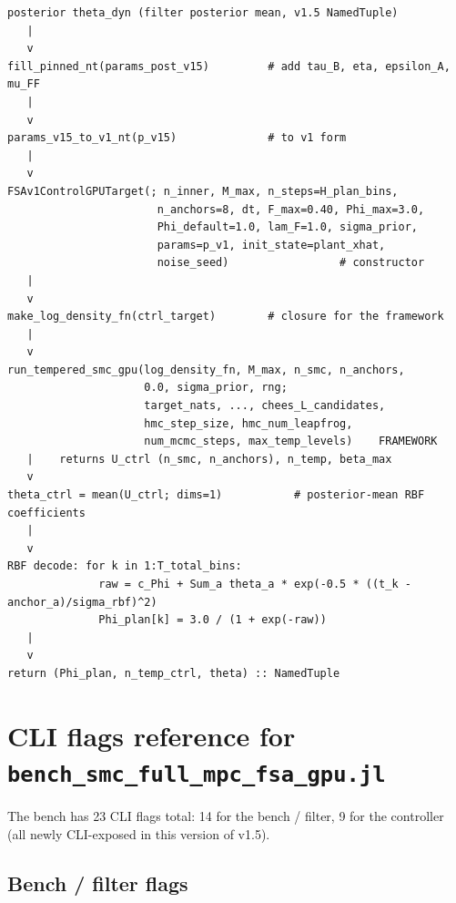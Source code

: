 \documentclass[11pt,a4paper]{article}
\begin{document}
\begin{verbatim}
posterior theta_dyn (filter posterior mean, v1.5 NamedTuple)
   |
   v
fill_pinned_nt(params_post_v15)         # add tau_B, eta, epsilon_A, mu_FF
   |
   v
params_v15_to_v1_nt(p_v15)              # to v1 form
   |
   v
FSAv1ControlGPUTarget(; n_inner, M_max, n_steps=H_plan_bins,
                       n_anchors=8, dt, F_max=0.40, Phi_max=3.0,
                       Phi_default=1.0, lam_F=1.0, sigma_prior,
                       params=p_v1, init_state=plant_xhat,
                       noise_seed)                 # constructor
   |
   v
make_log_density_fn(ctrl_target)        # closure for the framework
   |
   v
run_tempered_smc_gpu(log_density_fn, M_max, n_smc, n_anchors,
                     0.0, sigma_prior, rng;
                     target_nats, ..., chees_L_candidates,
                     hmc_step_size, hmc_num_leapfrog,
                     num_mcmc_steps, max_temp_levels)    FRAMEWORK
   |    returns U_ctrl (n_smc, n_anchors), n_temp, beta_max
   v
theta_ctrl = mean(U_ctrl; dims=1)           # posterior-mean RBF coefficients
   |
   v
RBF decode: for k in 1:T_total_bins:
              raw = c_Phi + Sum_a theta_a * exp(-0.5 * ((t_k - anchor_a)/sigma_rbf)^2)
              Phi_plan[k] = 3.0 / (1 + exp(-raw))
   |
   v
return (Phi_plan, n_temp_ctrl, theta) :: NamedTuple
\end{verbatim}

\section{CLI flags reference for \texttt{bench\_smc\_full\_mpc\_fsa\_gpu.jl}}
\label{sec:flags}

The bench has 23 CLI flags total: 14 for the bench / filter, 9 for
the controller (all newly CLI-exposed in this version of v1.5).

\subsection{Bench / filter flags}
\end{document}
